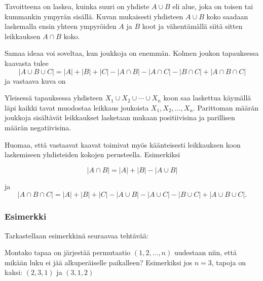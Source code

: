 Tavoitteena on laskea, kuinka suuri on yhdiste $A \cup B$
eli alue, joka on toisen tai kummankin ympyrän sisällä.
Kuvan mukaisesti yhdisteen $A \cup B$ koko
saadaan laskemalla ensin yhteen ympyröiden $A$ ja $B$ koot
ja vähentämällä siitä sitten leikkauksen $A \cap B$ koko.

Samaa ideaa voi soveltaa, kun joukkoja on enemmän.
Kolmen joukon tapauksessa kaavasta tulee
\[ |A \cup B \cup C| = |A| + |B| + |C| - |A \cap B|  - |A \cap C|  - |B \cap C| + |A \cap B \cap C| \]
ja vastaava kuva on

\begin{center}
\end{center}

Yleisessä tapauksessa yhdisteen $X_1 \cup X_2 \cup \cdots \cup X_n$
koon saa laskettua käymällä läpi kaikki tavat muodostaa
leikkaus joukoista $X_1,X_2,\ldots,X_n$.
Parittoman määrän joukkoja sisältävät leikkaukset
lasketaan mukaan positiivisina ja
parillisen määrän negatiivisina.

Huomaa, että vastaavat kaavat toimivat myös käänteisesti
leikkauksen koon laskemiseen yhdisteiden kokojen perusteella.
Esimerkiksi

\[ |A \cap B| = |A| + |B| - |A \cup B|\]

ja
\[ |A \cap B \cap C| = |A| + |B| + |C| - |A \cup B|  - |A \cup C|  - |B \cup C| + |A \cup B \cup C| .\]

\subsubsection{Esimerkki}

Tarkastellaan esimerkkinä seuraavaa tehtävää:

\begin{task}
Montako tapaa on järjestää permutaatio
$(1,2,\ldots,n)$ uudestaan niin,
että mikään luku ei jää alkuperäiselle paikalleen?
Esimerkiksi jos $n=3$, tapoja on kaksi: $(2,3,1)$ ja $(3,1,2)$
\end{task}

